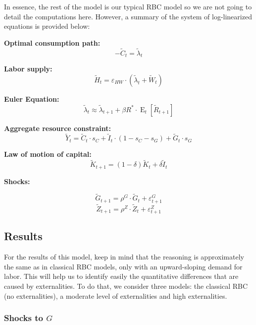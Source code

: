 \documentclass[12pt]{report}
\newcommand{\Et}[1]{\operatorname{E}_t\left[#1\right]}
\begin{document}
In essence, the rest of the model is our typical RBC model so we are not going to detail the computations here. However, a summary of the  system of log-linearized equations is provided below:

\textbf{Optimal consumption path:} $$ - \tilde C_t = \tilde \lambda_t $$

\textbf{Labor supply:}$$ \tilde H_t = \varepsilon_{HW} \cdot (\tilde\lambda_t + \tilde W_t) $$

\textbf{Euler Equation:}$$\tilde\lambda_t  \approx \tilde\lambda_{t+1} + \beta R^*\cdot\Et{\tilde R_{t+1}}$$

\textbf{Aggregate resource constraint:}$$ \tilde Y_t  = \tilde C_t \cdot s_C + \tilde I_t \cdot (1 - s_C - s_G) + \tilde G_t \cdot s_G $$

\textbf{Law of motion of capital:}$$ \tilde K_{t+1} = (1 - \delta)\tilde K_t + \delta \tilde I_t $$

\textbf{Shocks:}

$$\tilde G_{t+1} = \rho^G\cdot \tilde G_{t} + \varepsilon_{t+1}^G $$
$$\tilde Z_{t+1} = \rho^Z\cdot \tilde Z_{t} + \varepsilon_{t+1}^Z $$

\subsection{Results}

For the results of this model, keep in mind that the reasoning is approximately the same as in classical RBC models, only with an upward-sloping demand for labor. This will help us to identify easily the quantitative differences that are caused by externalities. To do that, we consider three models: the classical RBC (no externalities), a moderate level of externalities and high externalities.

\subsubsection{Shocks to $G$}
\end{document}

